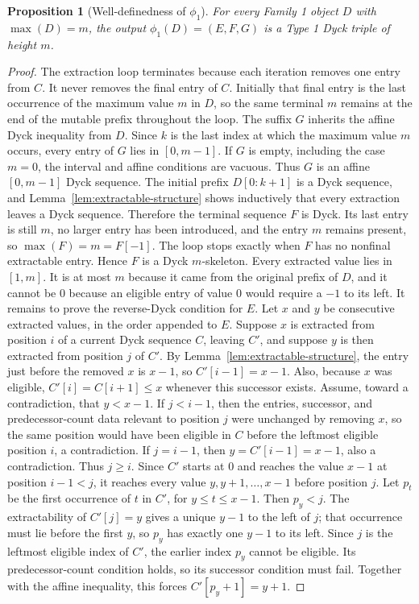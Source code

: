 \documentclass[11pt]{article}
\theoremstyle{plain}
\newtheorem{proposition}[theorem]{Proposition}
\theoremstyle{definition}
\theoremstyle{remark}
\begin{document}
\begin{proposition}[Well-definedness of \(\phi_1\)]
\label{prop:phi1-well-defined}
For every Family 1 object \(D\) with \(\max(D)=m\), the output
\(\phi_1(D)=(E,F,G)\) is a Type 1 Dyck triple of height \(m\).
\end{proposition}
\begin{proof}
The extraction loop terminates because each iteration removes one entry from
\(C\).  It never removes the final entry of \(C\).  Initially that final entry
is the last occurrence of the maximum value \(m\) in \(D\), so the same
terminal \(m\) remains at the end of the mutable prefix throughout the loop.
The suffix \(G\) inherits the affine Dyck inequality from \(D\).  Since \(k\)
is the last index at which the maximum value \(m\) occurs, every entry of
\(G\) lies in \([0,m-1]\).  If \(G\) is empty, including the case \(m=0\), the
interval and affine conditions are vacuous.  Thus \(G\) is an affine
\([0,m-1]\) Dyck sequence.
The initial prefix \(D[0:k+1]\) is a Dyck sequence, and Lemma~\ref{lem:extractable-structure}
shows inductively that every extraction leaves a Dyck sequence.  Therefore the
terminal sequence \(F\) is Dyck.  Its last entry is still \(m\), no larger
entry has been introduced, and the entry \(m\) remains present, so
\(\max(F)=m=F[-1]\).  The loop stops exactly when \(F\) has no nonfinal
extractable entry.  Hence \(F\) is a Dyck \(m\)-skeleton.
Every extracted value lies in \([1,m]\).  It is at most \(m\) because it came
from the original prefix of \(D\), and it cannot be \(0\) because an eligible
entry of value \(0\) would require a \(-1\) to its left.
It remains to prove the reverse-Dyck condition for \(E\).  Let \(x\) and
\(y\) be consecutive extracted values, in the order appended to \(E\).  Suppose
\(x\) is extracted from position \(i\) of a current Dyck sequence \(C\), leaving
\(C'\), and suppose \(y\) is then extracted from position \(j\) of \(C'\).  By
Lemma~\ref{lem:extractable-structure}, the entry just before the removed
\(x\) is \(x-1\), so \(C'[i-1]=x-1\).  Also, because \(x\) was eligible,
\(C'[i]=C[i+1]\le x\) whenever this successor exists.
Assume, toward a contradiction, that \(y<x-1\).  If \(j<i-1\), then the
entries, successor, and predecessor-count data relevant to position \(j\) were
unchanged by removing \(x\), so the same position would have been eligible in
\(C\) before the leftmost eligible position \(i\), a contradiction.  If
\(j=i-1\), then \(y=C'[i-1]=x-1\), also a contradiction.
Thus \(j\ge i\).  Since \(C'\) starts at \(0\) and reaches the value \(x-1\)
at position \(i-1<j\), it reaches every value \(y,y+1,\ldots,x-1\) before
position \(j\).  Let \(p_t\) be the first occurrence of \(t\) in \(C'\), for
\(y\le t\le x-1\).  Then \(p_y<j\).  The extractability of \(C'[j]=y\) gives a
unique \(y-1\) to the left of \(j\); that occurrence must lie before the first
\(y\), so \(p_y\) has exactly one \(y-1\) to its left.  Since \(j\) is the
leftmost eligible index of \(C'\), the earlier index \(p_y\) cannot be
eligible.  Its predecessor-count condition holds, so its successor condition
must fail.  Together with the affine inequality, this forces
\(C'[p_y+1]=y+1\).


\end{proof}
\end{document}
